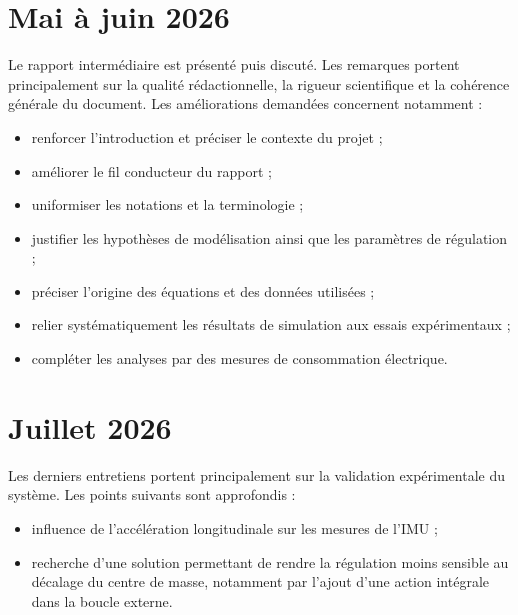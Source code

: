 \section*{Mai à juin 2026}
Le rapport intermédiaire est présenté puis discuté. Les remarques portent principalement sur la qualité rédactionnelle, la rigueur scientifique et la cohérence générale du document. Les améliorations demandées concernent notamment :
\begin{itemize}
    \item renforcer l'introduction et préciser le contexte du projet ;
    \item améliorer le fil conducteur du rapport ;
    \item uniformiser les notations et la terminologie ;
    \item justifier les hypothèses de modélisation ainsi que les paramètres de régulation ;
    \item préciser l'origine des équations et des données utilisées ;
    \item relier systématiquement les résultats de simulation aux essais expérimentaux ;
    \item compléter les analyses par des mesures de consommation électrique.
\end{itemize}

\section*{Juillet 2026}
Les derniers entretiens portent principalement sur la validation expérimentale du système. Les points suivants sont approfondis :
\begin{itemize}
    \item influence de l'accélération longitudinale sur les mesures de l'IMU ;
    \item recherche d'une solution permettant de rendre la régulation moins sensible au décalage du centre de masse, notamment par l'ajout d'une action intégrale dans la boucle externe.
\end{itemize}

